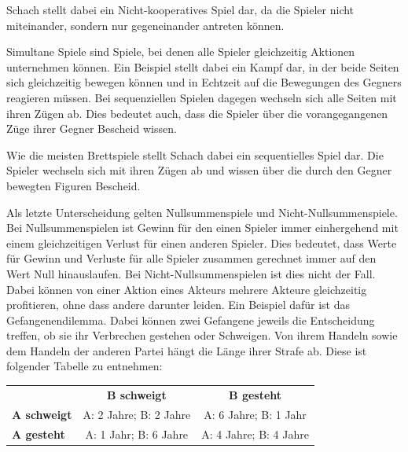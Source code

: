 
Schach stellt dabei ein Nicht-kooperatives Spiel dar, da die Spieler nicht miteinander, sondern nur gegeneinander antreten können.

Simultane Spiele sind Spiele, bei denen alle Spieler gleichzeitig Aktionen unternehmen können. Ein Beispiel stellt dabei ein Kampf dar, in der beide Seiten sich gleichzeitig bewegen können und in Echtzeit auf die Bewegungen des Gegners reagieren müssen. Bei sequenziellen Spielen dagegen wechseln sich alle Seiten mit ihren Zügen ab. Dies bedeutet auch, dass die Spieler über die vorangegangenen Züge ihrer Gegner Bescheid wissen. \cite{Rodriguez}

Wie die meisten Brettspiele stellt Schach dabei ein sequentielles Spiel dar. Die Spieler wechseln sich mit ihren Zügen ab und wissen über die durch den Gegner bewegten Figuren Bescheid.

Als letzte Unterscheidung gelten Nullsummenspiele und Nicht-Nullsummenspiele. Bei Nullsummenspielen ist Gewinn für den einen Spieler immer einhergehend mit einem gleichzeitigen Verlust für einen anderen Spieler. Dies bedeutet, dass Werte für Gewinn und Verluste für alle Spieler zusammen gerechnet immer auf den Wert Null hinauslaufen. Bei Nicht-Nullsummenspielen ist dies nicht der Fall. Dabei können von einer Aktion eines Akteurs mehrere Akteure gleichzeitig profitieren, ohne dass andere darunter leiden.\cite{Rodriguez} Ein Beispiel dafür ist das Gefangenendilemma. Dabei können zwei Gefangene jeweils die Entscheidung treffen, ob sie ihr Verbrechen gestehen oder Schweigen. Von ihrem Handeln sowie dem Handeln der anderen Partei hängt die Länge ihrer Strafe ab. \cite{Tweedale1993} Diese ist folgender Tabelle zu entnehmen:

\begin{tabular}{l c c}
& \textbf{B schweigt} & \textbf{B gesteht} \\
\textbf{A schweigt} & A: 2 Jahre; B: 2 Jahre & A: 6 Jahre; B: 1 Jahr \\
\textbf{A gesteht} & A: 1 Jahr; B: 6 Jahre & A: 4 Jahre; B: 4 Jahre
\end{tabular}


